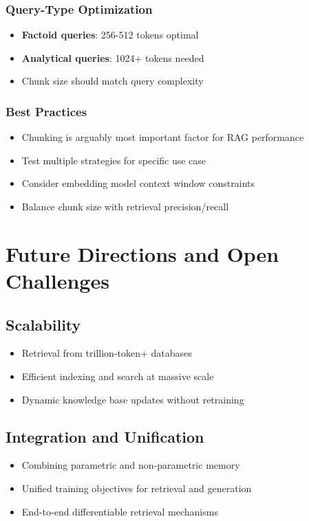 \documentclass[11pt,letterpaper]{article}
\begin{document}
\subsubsection{Query-Type Optimization}
\begin{itemize}[leftmargin=*]
    \item \textbf{Factoid queries}: 256-512 tokens optimal
    \item \textbf{Analytical queries}: 1024+ tokens needed
    \item Chunk size should match query complexity
\end{itemize}

\subsubsection{Best Practices}
\begin{itemize}[leftmargin=*]
    \item Chunking is arguably most important factor for RAG performance
    \item Test multiple strategies for specific use case
    \item Consider embedding model context window constraints
    \item Balance chunk size with retrieval precision/recall
\end{itemize}

\section{Future Directions and Open Challenges}

\subsection{Scalability}
\begin{itemize}[leftmargin=*]
    \item Retrieval from trillion-token+ databases
    \item Efficient indexing and search at massive scale
    \item Dynamic knowledge base updates without retraining
\end{itemize}

\subsection{Integration and Unification}
\begin{itemize}[leftmargin=*]
    \item Combining parametric and non-parametric memory
    \item Unified training objectives for retrieval and generation
    \item End-to-end differentiable retrieval mechanisms
\end{itemize}
\end{document}

